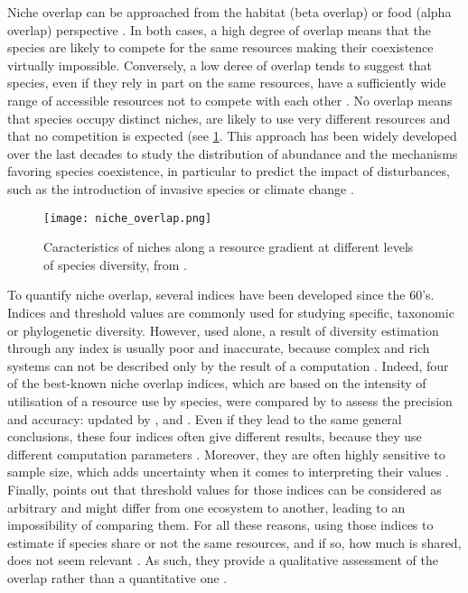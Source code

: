 Niche overlap can be approached from the habitat (beta overlap) or food (alpha overlap) perspective \citep{mouillot2005}. In both cases, a high degree of overlap means that the species are likely to compete for the same resources making their coexistence virtually impossible. Conversely, a low deree of overlap tends to suggest that species, even if they rely in part on the same resources, have a sufficiently wide range of accessible resources not to compete with each other \citep{mouillot2005}. No overlap means that species occupy distinct niches, are likely to use very different resources and that no competition is expected (see \ref{fig:lr1}. This approach has been widely developed over the last decades to study the distribution of abundance and the mechanisms favoring species coexistence, in particular to predict the impact of disturbances, such as the introduction of invasive species or climate change \citep{albouy2011,geange2011, martini2020}. 
\begin{figure} [!htbp]
	\begin{center}
		\texttt{[image: niche\_overlap.png]}
	\end{center}
	\caption[Caracteristics of niches along a resource gradient]{Caracteristics of niches along a resource gradient at different levels of species diversity, from \citet{kim2020}.}
	\label{fig:lr1}
\end{figure}

To quantify niche overlap, several indices have been developed since the 60’s. Indices and threshold values are commonly used for studying specific, taxonomic or phylogenetic diversity. However, used alone, a result of diversity estimation through any index is usually poor and inaccurate, because complex and rich systems can not be described only by the result of a computation \citep{mejri2009}. Indeed, four of the best-known niche overlap indices, which are based on the intensity of utilisation of a resource use by species, were compared by \citet{linton1981} to assess the precision and accuracy: \citet{morisita1959} updated by \citet{horn1966}, \citet{schoener1968} and \citet{pianka1973}. Even if they lead to the same general conclusions, these four indices often give different results, because they use different computation parameters \citep{blondel1979}. Moreover, they are often highly sensitive to sample size, which adds uncertainty when it comes to interpreting their values \citep{linton1981}. Finally, \citet{grossman2009} points out that threshold values for those indices can be considered as arbitrary and might differ from one ecosystem to another, leading to an impossibility of comparing them. For all these reasons, using those indices to estimate if species share or not the same resources, and if so, how much is shared, does not seem relevant \citep{mouillot2005}. As such, they provide a qualitative assessment of the overlap rather than a quantitative one \citep{linton1981}.

